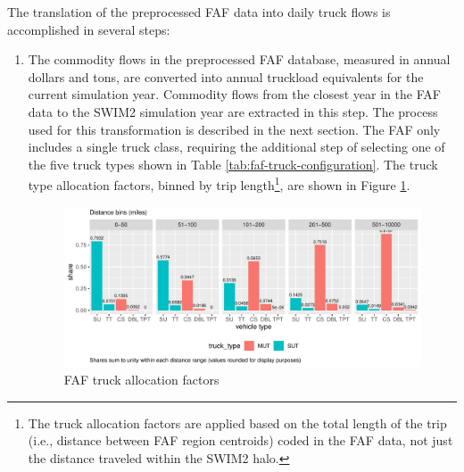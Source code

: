 The translation of the preprocessed FAF data into daily truck flows is accomplished in several steps:
\begin{enumerate}
    \item The commodity flows in the preprocessed FAF database, measured in annual dollars and tons, are converted into annual truckload equivalents for the current simulation year. Commodity flows from the closest year in the FAF data to the SWIM2 simulation year are extracted in this step. The process used for this transformation is described in the next section. The FAF only includes a single truck class, requiring the additional step of selecting one of the five truck types shown in Table \ref{tab:faf-truck-configuration}. The truck type allocation factors, binned by trip length\footnote{The truck allocation factors are applied based on the total length of the trip (i.e., distance between FAF region centroids) coded in the FAF data, not just the distance traveled within the SWIM2 halo.}, are shown in Figure \ref{fig:truck-allocation-factors}.

\begin{figure}
\centering
\includegraphics[width=6.6in]{figures/graph-truck-allocation-factors.pdf}
\caption{FAF truck allocation factors}
\label{fig:truck-allocation-factors}
\end{figure}


\end{enumerate}

